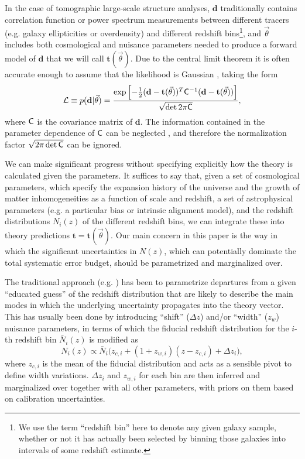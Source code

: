 \documentclass[a4paper,11pt]{article}
\newcommand{\vd}{\mathbf{d}}
\newcommand{\vt}{\mathbf{t}}
\begin{document}
      In the case of tomographic large-scale structure analyses, $\vd$ traditionally contains correlation function or power spectrum measurements between different tracers (e.g. galaxy ellipticities or overdensity) and different redshift bins\footnote{We use the term ``redshift bin'' here to denote any given galaxy sample, whether or not it has actually been selected by binning those galaxies into intervals of some redshift estimate.}, and $\vec{\theta}$ includes both cosmological and nuisance parameters needed to produce a forward model of $\vd$ that we will call $\vt(\vec{\theta})$. Due to the central limit theorem it is often accurate enough to assume that the likelihood is Gaussian \cite{2018MNRAS.473.2355S}, taking the form
      \begin{equation}
        \mathcal{L} \equiv p({\bf d}|\vec{\theta}) = \frac{\exp\left [-\frac{1}{2}(\vd-\vt(\vec{\theta}))^T{\sf C}^{-1}(\vd-\vt(\vec{\theta})) \right]}{\sqrt{\det{2\pi{\sf C}}}}, \label{eq:like}
     \end{equation}
      where ${\sf C}$ is the covariance matrix of $\vd$. The information contained in the parameter dependence of ${\sf C}$ can be neglected \citep{1811.11584}, and therefore the normalization factor $\sqrt{2\pi\det{\sf C}}$ can be ignored.

      We can make significant progress without specifying explicitly how the theory is calculated given the parameters. It suffices to say that, given a set of cosmological parameters, which specify the expansion history of the universe and the growth of matter inhomogeneities as a function of scale and redshift, a set of astrophysical parameters (e.g. a particular bias or intrinsic alignment model), and the redshift distributions $N_i(z)$ of the different redshift bins, we can integrate these into theory predictions $\vt=\vt(\vec{\theta})$. Our main concern in this paper is the way in which the significant uncertainties in $N(z)$, which can potentially dominate the total systematic error budget, should be parametrized and marginalized over.

      The traditional approach (e.g. \cite{2018PhRvD..98d3526A,2019PASJ...71...43H,1912.08209,2020A&A...637A.100W}) has been to parametrize departures from a given ``educated guess'' of the redshift distribution that are likely to describe the main modes in which the underlying uncertainty propagates into the theory vector. This has usually been done by introducing ``shift'' ($\Delta z$) and/or ``width'' ($z_w$) nuisance parameters, in terms of which the fiducial redshift distribution for the $i$-th redshift bin $\bar{N}_i(z)$ is modified as
      \begin{equation}
        N_{i}(z) \propto \bar{N}_{i}\big(z_{c,i} + (1 + z_{w, i})(z-z_{c, i}) + \Delta z_{i}\big), \label{eq:photo-z-model}
      \end{equation}
      where $z_{c,i}$ is the mean of the fiducial distribution and acts as a sensible pivot to define width variations. $\Delta z_i$ and $z_{w,i}$ for each bin are then inferred and marginalized over together with all other parameters, with priors on them based on calibration uncertainties.
\end{document}
